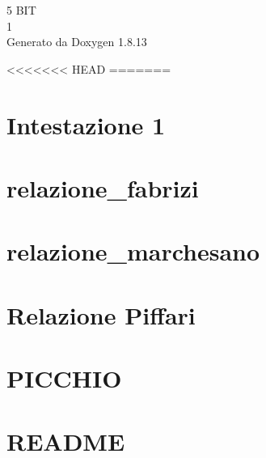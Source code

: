 \documentclass[twoside]{book}
\newcommand{\+}{\discretionary{\mbox{\scriptsize$\hookleftarrow$}}{}{}}
\newcommand{\clearemptydoublepage}{%
  \newpage{\pagestyle{empty}\cleardoublepage}%
}
\begin{document}
\hypersetup{pageanchor=false,
             bookmarksnumbered=true,
             pdfencoding=unicode
            }
\begin{titlepage}
\vspace*{7cm}
\begin{center}%
{\Large 5 B\+IT \\[1ex]\large 1 }\\
\vspace*{1cm}
{\large Generato da Doxygen 1.8.13}\\
\end{center}
\end{titlepage}
\clearemptydoublepage
{}
\tableofcontents
\clearemptydoublepage
{}
\hypersetup{pageanchor=true}

<<<<<<< HEAD
=======
\chapter{Intestazione 1}
\label{md_documenti_documentazione_prova}

\chapter{relazione\+\_\+fabrizi}
\label{md_documenti_documentazione_relazione_fabrizi}

\chapter{relazione\+\_\+marchesano}
\label{md_documenti_documentazione_relazione_marchesano}

\chapter{Relazione Piffari}
\label{md_documenti_documentazione_relazione_piffari}

\chapter{P\+I\+C\+C\+H\+IO}
\label{md_documenti_PICCHIO}

\chapter{R\+E\+A\+D\+ME}
\label{md_manuali_sito_css_README}

\end{document}
